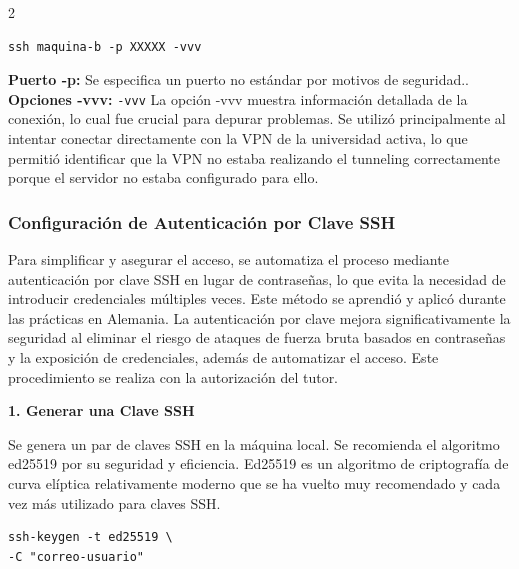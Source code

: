 \begin{multicols*}{2}
\begin{center}
\begin{minipage}{0.95\linewidth}
\begin{verbatim}
ssh maquina-b -p XXXXX -vvv
\end{verbatim}
\end{minipage}
\end{center}

\noindent\textbf{Puerto -p:} Se especifica un puerto no estándar por motivos de seguridad..\\
\textbf{Opciones -vvv:} \texttt{-vvv} La opción -vvv muestra información detallada de la conexión, lo cual fue crucial para depurar problemas. Se utilizó principalmente al intentar conectar directamente con la VPN de la universidad activa, lo que permitió identificar que la VPN no estaba realizando el tunneling correctamente porque el servidor no estaba configurado para ello.

\subsubsection*{Configuración de Autenticación por Clave SSH}

Para simplificar y asegurar el acceso, se automatiza el proceso mediante autenticación por clave SSH en lugar de contraseñas, lo que evita la necesidad de introducir credenciales múltiples veces. Este método se aprendió y aplicó durante las prácticas en Alemania. La autenticación por clave mejora significativamente la seguridad al eliminar el riesgo de ataques de fuerza bruta basados en contraseñas y la exposición de credenciales, además de automatizar el acceso. Este procedimiento se realiza con la autorización del tutor.

\vspace{\baselineskip}

\noindent\textbf{1. Generar una Clave SSH}

Se genera un par de claves SSH en la máquina local. Se recomienda el algoritmo ed25519 por su seguridad y eficiencia. Ed25519 es un algoritmo de criptografía de curva elíptica relativamente moderno que se ha vuelto muy recomendado y cada vez más utilizado para claves SSH. 

\begin{center}
\begin{minipage}{0.95\linewidth}
\begin{verbatim}
ssh-keygen -t ed25519 \
-C "correo-usuario"
\end{verbatim}
\end{minipage}
\end{center}


\end{multicols*}
